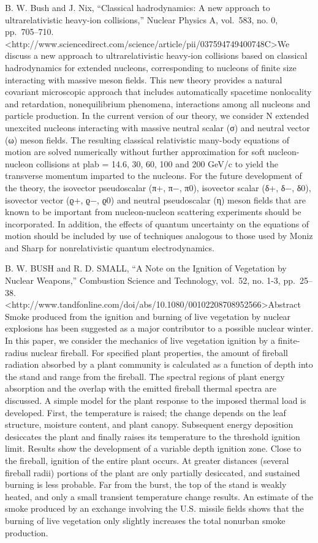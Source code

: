\documentclass[]{article}
\begin{document}
B. W. Bush and J. Nix, ``Classical hadrodynamics: A new approach to
ultrarelativistic heavy-ion collisions,'' Nuclear Physics A, vol.~583,
no. 0, pp.~705--710.
\textless{}http://www.sciencedirect.com/science/article/pii/037594749400748C\textgreater{}We
discuss a new approach to ultrarelativistic heavy-ion collisions based
on classical hadrodynamics for extended nucleons, corresponding to
nucleons of finite size interacting with massive meson fields. This new
theory provides a natural covariant microscopic approach that includes
automatically spacetime nonlocality and retardation, nonequilibrium
phenomena, interactions among all nucleons and particle production. In
the current version of our theory, we consider N extended unexcited
nucleons interacting with massive neutral scalar (σ) and neutral vector
(ω) meson fields. The resulting classical relativistic many-body
equations of motion are solved numerically without further approximation
for soft nucleon-nucleon collisions at plab = 14.6, 30, 60, 100 and 200
GeV/c to yield the transverse momentum imparted to the nucleons. For the
future development of the theory, the isovector pseudoscalar (π+, π−,
π0), isovector scalar (δ+, δ−, δ0), isovector vector (ϱ+, ϱ−, ϱ0) and
neutral pseudoscalar (η) meson fields that are known to be important
from nucleon-nucleon scattering experiments should be incorporated. In
addition, the effects of quantum uncertainty on the equations of motion
should be included by use of techniques analogous to those used by Moniz
and Sharp for nonrelativistic quantum electrodynamics.

B. W. BUSH and R. D. SMALL, ``A Note on the Ignition of Vegetation by
Nuclear Weapons,'' Combustion Science and Technology, vol.~52, no. 1-3,
pp.~25--38.
\textless{}http://www.tandfonline.com/doi/abs/10.1080/00102208708952566\textgreater{}Abstract
Smoke produced from the ignition and burning of live vegetation by
nuclear explosions has been suggested as a major contributor to a
possible nuclear winter. In this paper, we consider the mechanics of
live vegetation ignition by a finite-radius nuclear fireball. For
specified plant properties, the amount of fireball radiation absorbed by
a plant community is calculated as a function of depth into the stand
and range from the fireball. The spectral regions of plant energy
absorption and the overlap with the emitted fireball thermal spectra are
discussed. A simple model for the plant response to the imposed thermal
load is developed. First, the temperature is raised; the change depends
on the leaf structure, moisture content, and plant canopy. Subsequent
energy deposition desiccates the plant and finally raises its
temperature to the threshold ignition limit. Results show the
development of a variable depth ignition zone. Close to the fireball,
ignition of the entire plant occurs. At greater distances (several
fireball radii) portions of the plant are only partially desiccated, and
sustained burning is less probable. Far from the burst, the top of the
stand is weakly heated, and only a small transient temperature change
results. An estimate of the smoke produced by an exchange involving the
U.S. missile fields shows that the burning of live vegetation only
slightly increases the total nonurban smoke production.
\end{document}
